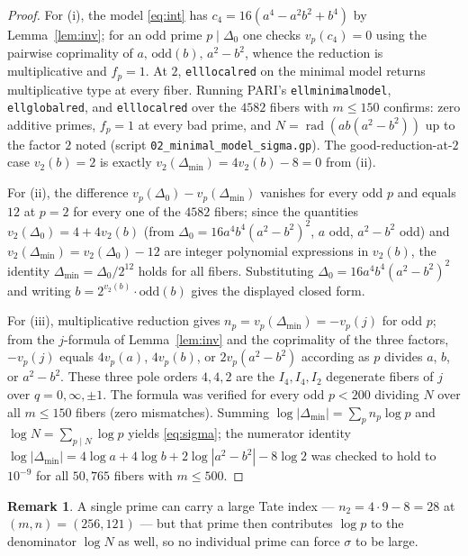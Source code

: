 \documentclass[11pt,reqno]{amsart}
\theoremstyle{plain}
\theoremstyle{definition}
\newtheorem{remark}[theorem]{Remark}
\newcommand{\rad}{\operatorname{rad}}
\begin{document}
\begin{proof}
For (i), the model \eqref{eq:int} has $c_4=16(a^4-a^2b^2+b^4)$ by
Lemma~\ref{lem:inv}; for an odd prime $p\mid\Delta_0$ one checks $v_p(c_4)=0$
using the pairwise coprimality of $a,\,\mathrm{odd}(b),\,a^2-b^2$, whence the
reduction is multiplicative and $f_p=1$. At $2$, \texttt{elllocalred} on the
minimal model returns multiplicative type at every fiber. Running PARI's
\texttt{ellminimalmodel}, \texttt{ellglobalred}, and \texttt{elllocalred} over
the $4582$ fibers with $m\le150$ confirms: zero additive primes,
$f_p=1$ at every bad prime, and $N=\rad(ab(a^2-b^2))$ up to the factor $2$ noted
(script \texttt{02\_minimal\_model\_sigma.gp}). The good-reduction-at-$2$ case
$v_2(b)=2$ is exactly $v_2(\Delta_{\min})=4v_2(b)-8=0$ from (ii).

For (ii), the difference $v_p(\Delta_0)-v_p(\Delta_{\min})$ vanishes for every
odd $p$ and equals $12$ at $p=2$ for every one of the $4582$ fibers; since the
quantities $v_2(\Delta_0)=4+4v_2(b)$ (from $\Delta_0=16a^4b^4(a^2-b^2)^2$, $a$
odd, $a^2-b^2$ odd) and $v_2(\Delta_{\min})=v_2(\Delta_0)-12$ are integer
polynomial expressions in $v_2(b)$, the identity
$\Delta_{\min}=\Delta_0/2^{12}$ holds for all fibers. Substituting
$\Delta_0=16a^4b^4(a^2-b^2)^2$ and writing $b=2^{v_2(b)}\cdot\mathrm{odd}(b)$
gives the displayed closed form.

For (iii), multiplicative reduction gives $n_p=v_p(\Delta_{\min})=-v_p(j)$ for
odd $p$; from the $j$-formula of Lemma~\ref{lem:inv} and the coprimality of the
three factors, $-v_p(j)$ equals $4v_p(a)$, $4v_p(b)$, or $2v_p(a^2-b^2)$ according
as $p$ divides $a$, $b$, or $a^2-b^2$. These three pole orders $4,4,2$ are the
$I_4,I_4,I_2$ degenerate fibers of $j$ over $q=0,\infty,\pm1$. The formula was
verified for every odd $p<200$ dividing $N$ over all $m\le150$ fibers (zero
mismatches). Summing $\log|\Delta_{\min}|=\sum_p n_p\log p$ and
$\log N=\sum_{p\mid N}\log p$ yields \eqref{eq:sigma}; the numerator identity
$\log|\Delta_{\min}|=4\log a+4\log b+2\log|a^2-b^2|-8\log2$ was checked to hold to
$10^{-9}$ for all $50{,}765$ fibers with $m\le500$.
\end{proof}

\begin{remark}
A single prime can carry a large Tate index --- $n_2=4\cdot9-8=28$ at
$(m,n)=(256,121)$ --- but that prime then contributes $\log p$ to the denominator
$\log N$ as well, so no individual prime can force $\sigma$ to be large.
\end{remark}
\end{document}
